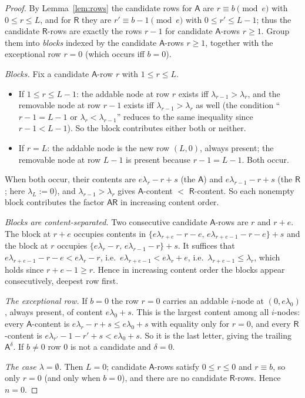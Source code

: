 \documentclass[11pt]{article}
\theoremstyle{definition}
\newcommand{\Aa}{{\mathsf A}}
\newcommand{\Rr}{{\mathsf R}}
\begin{document}
\begin{proof}
By Lemma~\ref{lem:rows} the candidate rows for $\Aa$ are
$r \equiv b \pmod e$ with $0 \le r \le L$, and for $\Rr$ they are
$r' \equiv b - 1 \pmod e$ with $0 \le r' \le L-1$; thus the candidate
$\Rr$-rows are exactly the rows $r - 1$ for candidate $\Aa$-rows $r \ge 1$.
Group them into \emph{blocks} indexed by the candidate $\Aa$-rows
$r \ge 1$, together with the exceptional row $r = 0$ (which occurs iff
$b = 0$).

\smallskip\noindent\emph{Blocks.} Fix a candidate $\Aa$-row $r$ with
$1 \le r \le L$.
\begin{itemize}
\item If $1 \le r \le L-1$: the addable node at row $r$ exists iff
  $\lambda_{r-1} > \lambda_r$, and the removable node at row $r-1$ exists
  iff $\lambda_{r-1} > \lambda_r$ as well (the condition
  ``$r-1 = L-1$ or $\lambda_{r} < \lambda_{r-1}$'' reduces to the same
  inequality since $r - 1 < L-1$). So the block contributes either both
  or neither.
\item If $r = L$: the addable node is the new row $(L,0)$, always present;
  the removable node at row $L-1$ is present because $r-1 = L-1$. Both
  occur.
\end{itemize}
When both occur, their contents are $e\lambda_r - r + s$ (the $\Aa$) and
$e\lambda_{r-1} - r + s$ (the $\Rr$; here $\lambda_L := 0$), and
$\lambda_{r-1} > \lambda_r$ gives $\Aa$-content $<$ $\Rr$-content.
So each nonempty block contributes the factor $\Aa\Rr$ in increasing
content order.

\smallskip\noindent\emph{Blocks are content-separated.} Two consecutive
candidate $\Aa$-rows are $r$ and $r + e$. The block at $r+e$ occupies
contents in $\{e\lambda_{r+e} - r - e,\, e\lambda_{r+e-1} - r - e\} + s$
and the block at $r$ occupies $\{e\lambda_r - r,\, e\lambda_{r-1} - r\} + s$.
It suffices that $e\lambda_{r+e-1} - r - e < e\lambda_r - r$, i.e.\
$e\lambda_{r+e-1} < e\lambda_r + e$, i.e.\ $\lambda_{r+e-1} \le \lambda_r$,
which holds since $r + e - 1 \ge r$. Hence in increasing content order the
blocks appear consecutively, deepest row first.

\smallskip\noindent\emph{The exceptional row.} If $b = 0$ the row $r = 0$
carries an addable $i$-node at $(0, e\lambda_0)$, always present, of
content $e\lambda_0 + s$. This is the largest content among all
$i$-nodes: every $\Aa$-content is $e\lambda_r - r + s \le e\lambda_0 + s$
with equality only for $r=0$, and every $\Rr$-content is
$e\lambda_{r'} - 1 - r' + s < e\lambda_0 + s$. So it is the last letter,
giving the trailing $\Aa^{\delta}$. If $b \ne 0$ row $0$ is not a
candidate and $\delta = 0$.

\smallskip\noindent\emph{The case $\lambda = \emptyset$.} Then $L = 0$;
candidate $\Aa$-rows satisfy $0 \le r \le 0$ and $r \equiv b$, so only
$r=0$ (and only when $b=0$), and there are no candidate $\Rr$-rows. Hence
$n = 0$.
\end{proof}
\end{document}
